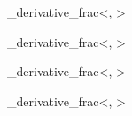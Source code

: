 
%
%
%
%

\TemplateInstancePIE\pd\tmpl_derivative_frac<\partial, \frac>

%
%
%
%

\TemplateInstancePIE\lpd\tmpl_derivative_frac<\partial, \sfrac>

%
%
%
%

\TemplateInstancePIE\tpd\tmpl_derivative_frac<\partial, \tfrac>

%
%
%
%

\TemplateInstancePIE\dpd\tmpl_derivative_frac<\partial, \dfrac>

\ExplSyntaxOff


